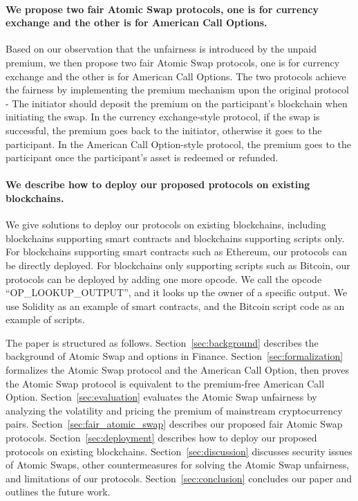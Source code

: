 \paragraph{We propose two fair Atomic Swap protocols, one is for currency exchange and the other is for American Call Options.}
Based on our observation that the unfairness is introduced by the unpaid premium,
we then propose two fair Atomic Swap protocols, one is for currency exchange and the other is for American Call Options.
The two protocols achieve the fairness by implementing the premium mechanism upon the original protocol - The initiator should deposit the premium on the participant's blockchain when initiating the swap.
In the currency exchange-style protocol, if the swap is successful, the premium goes back to the initiator, otherwise it goes to the participant.
In the American Call Option-style protocol, the premium goes to the participant once the participant's asset is redeemed or refunded.

\paragraph{We describe how to deploy our proposed protocols on existing blockchains.}
We give solutions to deploy our protocols on existing blockchains, including blockchains supporting smart contracts and blockchains supporting scripts only.
For blockchains supporting smart contracts such as Ethereum, our protocols can be directly deployed.
For blockchains only supporting scripts such as Bitcoin, our protocols can be deployed by adding one more opcode.
We call the opcode ``OP\_LOOKUP\_OUTPUT'', and it looks up the owner of a specific output.
We use Solidity as an example of smart contracts, and the Bitcoin script code as an example of scripts.

The paper is structured as follows.
Section~\ref{sec:background} describes the background of Atomic Swap and options in Finance.
Section~\ref{sec:formalization} formalizes the Atomic Swap protocol and the American Call Option, then proves the Atomic Swap protocol is equivalent to the premium-free American Call Option.
Section~\ref{sec:evaluation} evaluates the Atomic Swap unfairness by analyzing the volatility and pricing the premium of mainstream cryptocurrency pairs.
Section~\ref{sec:fair_atomic_swap} describes our proposed fair Atomic Swap protocols.
Section~\ref{sec:deployment} describes how to deploy our proposed protocols on existing blockchains.
Section~\ref{sec:discussion} discusses security issues of Atomic Swaps, other countermeasures for solving the Atomic Swap unfairness, and limitations of our protocols.
Section~\ref{sec:conclusion} concludes our paper and outlines the future work.